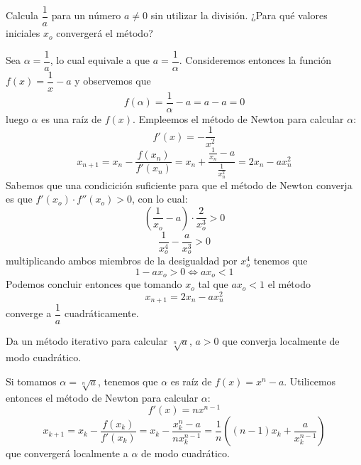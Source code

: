  \begin{ejer}
  Calcula $\dfrac{1}{a}$ para un número $a\neq 0$ sin utilizar la división. ¿Para qué valores iniciales $x_o$ convergerá el método?   
 \end{ejer}
 \begin{sol}
 Sea $\alpha=\dfrac{1}{a}$, lo cual equivale a que $a=\dfrac{1}{\alpha}$. Consideremos entonces la función $f(x)=\dfrac{1}{x}-a$ y observemos que
 $$f(\alpha)=\dfrac{1}{\alpha}-a=a-a=0$$
 luego $\alpha$ es una raíz de $f(x)$. Empleemos el método de Newton para calcular $\alpha$:
 $$f'(x)=-\dfrac{1}{x^2}$$
 $$x_{n+1}=x_n-\dfrac{f(x_n)}{f'(x_n)}=x_n+\dfrac{\frac{1}{x_n}-a}{\frac{1}{x_n^2}}=2x_n-ax_n^2$$
 Sabemos que una condicición suficiente para que el método de Newton converja es que $f'(x_o)\cdot f''(x_o)>0$, con lo cual:
 $$\left(\dfrac{1}{x_o}-a\right)\cdot \dfrac{2}{x_o^3}>0$$
 $$\dfrac{1}{x_o^4}-\dfrac{a}{x_o^3}>0$$
 multiplicando ambos miembros de la desigualdad por $x_o^4$ tenemos que
 $$1-ax_o>0\Longleftrightarrow ax_o<1$$
 Podemos concluir entonces que tomando $x_o$ tal que $ax_o<1$ el método
 $$x_{n+1}=2x_n-ax_n^2$$
 converge  a $\dfrac{1}{a}$ cuadráticamente.
 \end{sol}
 
\begin{ejer}
Da un método iterativo para calcular $\sqrt[n]{a}$, $a>0$ que converja localmente de modo cuadrático.
\end{ejer}
\begin{sol}
Si tomamos $\alpha=\sqrt[n]{a}$, tenemos que $\alpha$ es raíz de $f(x)=x^n-a$. Utilicemos entonces el método de Newton para calcular $\alpha$:
$$f'(x)=nx^{n-1}$$
$$x_{k+1}=x_k-\dfrac{f(x_k)}{f'(x_k)}=x_k-\dfrac{x_k^n-a}{nx_k^{n-1}}=\dfrac{1}{n}\left( (n-1)x_k+\dfrac{a}{x_k^{n-1}}\right)$$
que convergerá localmente a $\alpha$ de modo cuadrático.
\end{sol}

